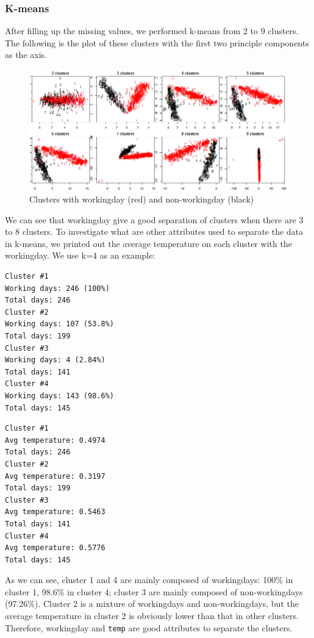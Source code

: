 \documentclass[12pt]{article}
\begin{document}
\subsubsection{K-means}	

After filling up the missing values, we performed k-means from 2 to 9 clusters. The following is the plot of these clusters with the first two principle components as the axis.
	\begin{figure}[H]
		\centering
		\includegraphics[scale=.65]{figures/kmeans_workingday.png}
		\caption{Clusters with workingday (red) and non-workingday (black)}
	\end{figure}

We can see that workingday give a good separation of clusters when there are 3 to 8 clusters. To investigate what are other attributes used to separate the data in k-means, we printed out the average temperature on each cluster with the workingday. We use k=4 as an example: \color{blue}
\begin{multicols}{2}
	\begin{verbatim}
Cluster #1
Working days: 246 (100%)
Total days: 246
Cluster #2
Working days: 107 (53.8%)
Total days: 199
Cluster #3
Working days: 4 (2.84%)
Total days: 141
Cluster #4
Working days: 143 (98.6%)
Total days: 145
	\end{verbatim}
	\columnbreak
	\begin{verbatim}
Cluster #1
Avg temperature: 0.4974
Total days: 246
Cluster #2
Avg temperature: 0.3197
Total days: 199
Cluster #3
Avg temperature: 0.5463
Total days: 141
Cluster #4
Avg temperature: 0.5776
Total days: 145
	\end{verbatim}
\end{multicols} 
\color{black}
As we can see, cluster 1 and 4 are mainly composed of workingdays: 100\% in cluster 1, 98.6\% in cluster 4; cluster 3 are mainly composed of non-workingdays (97.26\%).  Cluster 2 is a mixture of workingdays and non-workingdays, but the average temperature in cluster 2 is obviously lower than that in other clusters. Therefore, workingday and \texttt{temp} are good attributes to separate the clusters.
\end{document}
